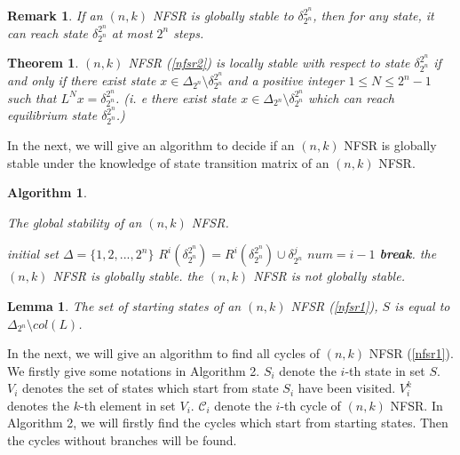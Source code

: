 \documentclass[conference]{IEEEtran}
\newtheorem{theorem}{Theorem}
\newtheorem{lemma}{Lemma}
\newtheorem{remark}{Remark}
\newtheorem{algorithm}{Algorithm}
\begin{document}
\begin{remark}
If an $(n,k)$ NFSR is globally stable to $\delta^{2^n}_{2^n}$, then for any state, it can reach state $\delta^{2^n}_{2^n}$ at most $2^n$ steps.
\end{remark}

\begin{theorem}
$(n,k)$ NFSR (\ref{nfsr2}) is locally stable with respect to state $\delta^{2^n}_{2^n}$ if and only if there exist state $x\in \Delta_{2^n} \setminus \delta^{2^n}_{2^n}$ and a positive integer $1\leq N\leq 2^n-1$ such that $L^Nx=\delta^{2^n}_{2^n}$. (i. e there exist state $x\in \Delta_{2^n} \setminus \delta^{2^n}_{2^n}$ which can reach equilibrium state $\delta^{2^n}_{2^n}$.)
\end{theorem}


In the next, we will give an algorithm to decide if an $(n,k)$ NFSR is globally stable under the knowledge of state transition matrix of an $(n,k)$ NFSR.
\begin{algorithm}\label{algorithm1}
\caption{The global stability of an $(n,k)$ NFSR.}
\begin{algorithmic}[1]
\STATE initial set $\Delta=\{1,2,...,2^n\}$
\STATE $R^i(\delta^{2^n}_{2^n})=R^i(\delta^{2^n}_{2^n})\cup \delta^j_{2^n}$
\ENDIF
\ENDFOR
{}
\STATE $num=i-1$
\STATE \textbf{break}.
\ENDIF
\ENDFOR
{}
\STATE the $(n,k)$ NFSR is globally stable.
\ELSE
\STATE the $(n,k)$ NFSR is not globally stable.
\ENDIF
\end{algorithmic}
\end{algorithm}


\begin{lemma}
The set of starting states of an $(n,k)$ NFSR (\ref{nfsr1}), $S$ is equal to $\Delta_{2^n}\setminus col(L)$.
\end{lemma}

In the next, we will give an algorithm to find all cycles of $(n,k)$ NFSR (\ref{nfsr1}).
We firstly give some notations in Algorithm 2. $S_i$ denote the $i$-th state in set $S$.
$V_i$ denotes the set of states which start from state $S_i$ have been visited. $V^k_i$ denotes the $k$-th element in set $V_i$.
$\mathcal{C}_i$ denote the $i$-th cycle of $(n,k)$ NFSR.
 In Algorithm 2, we will firstly find the cycles which start from starting states. Then the cycles without branches will be found.
\end{document}
